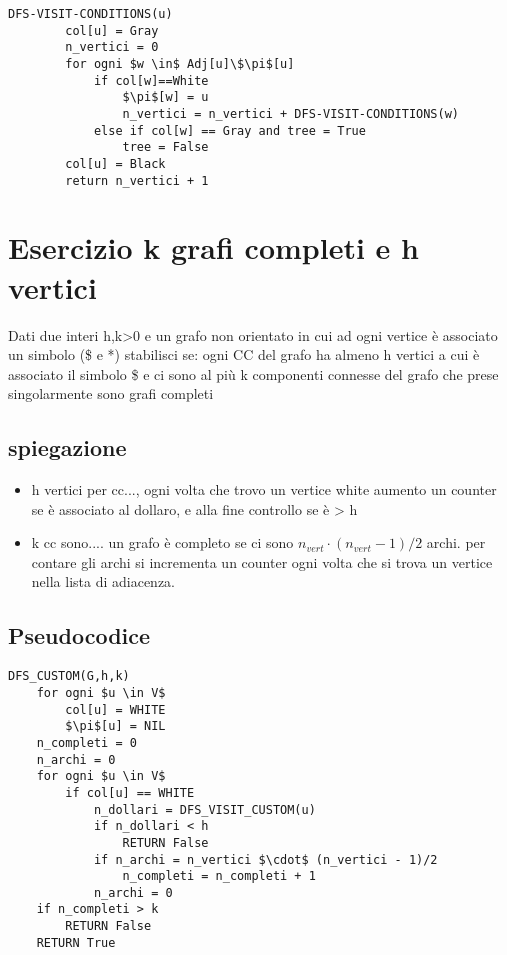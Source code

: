 \documentclass[12pt, a4paper, openany]{book}
\begin{document}
	\begin{lstlisting}[mathescape=true]
    DFS-VISIT-CONDITIONS(u)
        col[u] = Gray
        n_vertici = 0
        for ogni $w \in$ Adj[u]\$\pi$[u]
            if col[w]==White
                $\pi$[w] = u
                n_vertici = n_vertici + DFS-VISIT-CONDITIONS(w)
            else if col[w] == Gray and tree = True
                tree = False
        col[u] = Black
        return n_vertici + 1
    \end{lstlisting}

	\section{Esercizio k grafi completi e h vertici}
	Dati due interi h,k>0 e un grafo non orientato  in cui ad ogni vertice è associato un simbolo (\$ e *)
	stabilisci se: ogni CC del grafo ha almeno h vertici a cui è associato il simbolo \$
	e ci sono al più k componenti connesse del grafo che prese singolarmente sono grafi completi

	\subsection*{spiegazione}
	\begin{itemize}
		\item h vertici per cc..., ogni volta che trovo un vertice white aumento un counter se è associato al dollaro, e alla fine controllo se è > h
		\item k cc sono.... un grafo è completo se ci sono $n_{vert} \cdot (n_{vert} -1)/2$ archi. per contare gli archi si incrementa un counter ogni volta che si trova un vertice nella lista di adiacenza.
	\end{itemize}

	\subsection*{Pseudocodice}
	\begin{lstlisting}[mathescape=true]
DFS_CUSTOM(G,h,k)
    for ogni $u \in V$
        col[u] = WHITE
        $\pi$[u] = NIL
    n_completi = 0
    n_archi = 0
    for ogni $u \in V$
        if col[u] == WHITE
            n_dollari = DFS_VISIT_CUSTOM(u)
            if n_dollari < h
                RETURN False
            if n_archi = n_vertici $\cdot$ (n_vertici - 1)/2
                n_completi = n_completi + 1
            n_archi = 0
    if n_completi > k
        RETURN False
    RETURN True
\end{lstlisting}
\end{document}
